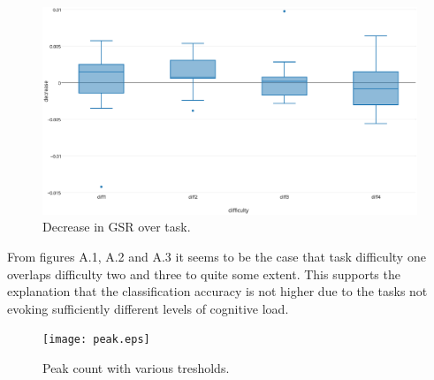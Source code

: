 \documentclass[11pt,leqno,a4paper]{report} %
\begin{document}
\begin{figure}[H]
  \centering
 	\hspace*{-.3\textwidth}   
 	\includegraphics[width=1.6\textwidth]{decgsr.eps}
  \caption{Decrease in GSR over task.}
\end{figure}

From figures A.1, A.2 and A.3 it seems to be the case that task difficulty one overlaps difficulty two and three to quite some extent. This supports the explanation that the classification accuracy is not higher due to the tasks not  evoking sufficiently different levels of cognitive load.

\begin{figure}[H]
  \centering
 	\hspace*{-.3\textwidth}   
 	\texttt{[image: peak.eps]}
  \caption{Peak count with various tresholds.}
\end{figure}


{}
%
\end{document}

